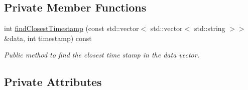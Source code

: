 \subsection*{Private Member Functions}
\begin{DoxyCompactItemize}
\item 
int \hyperlink{classIEvent_a9fe52c0b0da4a3768c37b3b4a8c19101}{find\+Closest\+Timestamp} (const std\+::vector$<$ std\+::vector$<$ std\+::string $>$$>$ \&data, int timestamp) const
\begin{DoxyCompactList}\small\item\em Public method to find the closest time stamp in the data vector. \end{DoxyCompactList}\end{DoxyCompactItemize}
\subsection*{Private Attributes}
